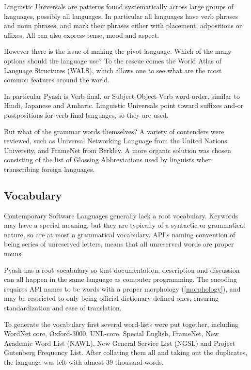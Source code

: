 Linguistic Universals\cite{LingUA} are patterns found systematically across
large groups of languages, possibly all languages. In particular all languages
have verb phrases and noun phrases, and mark their phrases either with
placement, adpositions or affixes. All can also express tense, mood and aspect. 

However there is the issue of making the pivot language. Which of
the many options should the language use? To the rescue comes the World Atlas of Language 
Structures\cite{WALS} (WALS), which allows one to see what are the most common features
around the world. 

In particular Pyash is Verb-final, or Subject-Object-Verb
word-order, similar to Hindi, Japanese and Amharic.
 Linguistic Universals point toward
suffixes and-or postpositions for verb-final languages, so they are used.

But what of the grammar words themselves? A variety of
contenders were reviewed, such as Universal Networking Language\cite{UNL} from the United
Nations University, and FrameNet\cite{FrameNet} from Berkley.
A more organic solution was chosen consisting of the list of Glossing 
Abbreviations\cite{glossAbv} used by linguists when transcribing foreign 
languages. 

\subsection{Vocabulary}\label{vocabulary}

Contemporary Software Languages generally lack a root vocabulary. Keywords may 
have a special meaning, but they are typically of a syntactic or grammatical
nature, so are at most a grammatical vocabulary. 
API's naming convention of being series of unreserved letters, means that all
unreserved words are proper nouns.  

Pyash has a root vocabulary so that documentation, description and discussion can 
all happen in the same language as computer programming. The encoding requires
API names to be  words with a proper morphology (\ref{morphology}), and may be
restricted to only being official dictionary defined ones, ensuring 
standardization and ease of translation.  

To generate the vocabulary first several word-lists were put together, including
  WordNet core\cite{wordnet}, 
  Oxford-3000\cite{oxford3000},
  UNL-core\cite{UNL},
Special English\cite{SpecialEnglish},
FrameNet\cite{FrameNet},
New Academic Word List (NAWL)\cite{NAWL}, 
New General Service List (NGSL)\cite{NGSL} and
Project Gutenberg Frequency List\cite{GutenbergFL}.  After collating them all
and taking out the duplicates, the language was left with almost 39 thousand words.

